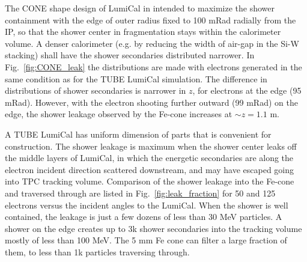 The CONE shape design of LumiCal in intended to maximize the shower containment
with the edge of outer radius fixed to 100 mRad radially from the IP, so that the 
shower center in fragmentation stays within the calorimeter volume.  
A denser calorimeter 
(e.g. by reducing the width of air-gap in the Si-W stacking) shall have
the shower secondaries distributed narrower. 
In Fig.~\ref{fig:CONE_leak} the distributions are made with electrons 
generated in the same condition as for the TUBE LumiCal simulation.
The difference in distributions of shower secondaries is narrower in $z$,
for electrons at the edge (95 mRad).
However, with the electron shooting further outward (99 mRad) on the edge, 
the shower leakage observed by the Fe-cone increases at
$\sim z=1.1$ m.

A TUBE LumiCal has uniform dimension of parts that is convenient for construction.
The shower leakage is maximum when the shower center leaks off the middle layers
of LumiCal, in which the energetic secondaries are along the electron
incident direction scattered downstream, and may have escaped going into 
TPC tracking volume.
Comparison of the shower leakage into the Fe-cone and traversed through 
are listed in Fig.~\ref{fig:leak_fraction} for 50 and 125 electrons versus the
incident angles to the LumiCal. 
When the shower is well contained, the leakage is just a few dozens of 
less than 30 MeV particles.  A shower on the edge creates up to 3k 
shower secondaries into the tracking volume mostly of less than 100 MeV.
The 5 mm Fe cone can filter a large fraction of them, to less than 1k particles
traversing through.





